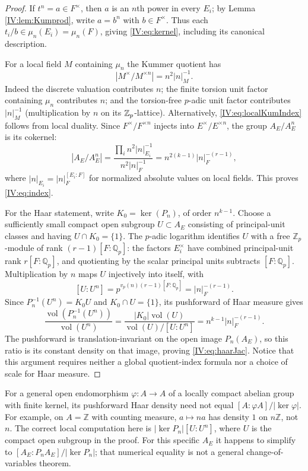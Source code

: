 \begin{proof}
If $t^n=a\in F^\times$, then $a$ is an $n$th power in every
$E_i$; by Lemma \ref{IV:lem:Kumprod}, write $a=b^n$ with $b\in F^\times$.
Thus each $t_i/b\in\mu_n(E_i)=\mu_n(F)$, giving
\eqref{IV:eq:kernel}, including its canonical description.

For a local field $M$ containing $\mu_n$ the Kummer quotient has
\begin{equation}\label{IV:eq:localKumIndex}
 |M^\times/M^{\times n}|=n^2|n|_M^{-1}.
\end{equation}
Indeed the discrete valuation contributes $n$; the finite
torsion unit factor containing $\mu_n$ contributes $n$; and
the torsion-free $p$-adic unit factor contributes
$|n|_M^{-1}$ (multiplication by $n$ on its $\mathbb Z_p$-lattice).  Alternatively, \eqref{IV:eq:localKumIndex}
follows from local duality.
Since $F^\times/F^{\times n}$ injects into
$E^\times/E^{\times n}$, the group $A_E/A_E^n$ is its cokernel:
\[
 |A_E/A_E^n|
 =\frac{\prod_i n^2|n|_{E_i}^{-1}}
             {n^2|n|_F^{-1}}
 =n^{2(k-1)}|n|_F^{-(r-1)},
\]
where $|n|_{E_i}=|n|_F^{[E_i:F]}$ for normalized absolute values
on local fields.  This proves \eqref{IV:eq:index}.

For the Haar statement, write $K_0=\ker(P_n)$, of order
$n^{k-1}$.  Choose a sufficiently small compact open subgroup
$U\subset A_E$ consisting of principal-unit classes and having
$U\cap K_0=\{1\}$.  The $p$-adic logarithm identifies $U$ with
a free $\mathbb Z_p$-module of rank
$(r-1)[F:\mathbb Q_p]$: the factors $E_i^\times$ have combined
principal-unit rank $r[F:\mathbb Q_p]$, and quotienting by the
scalar principal units subtracts $[F:\mathbb Q_p]$.
Multiplication by $n$ maps $U$ injectively into itself, with
\[
 [U:U^n]=p^{v_p(n)(r-1)[F:\mathbb Q_p]}
        =|n|_F^{-(r-1)}.
\]
Since $P_n^{-1}(U^n)=K_0U$ and $K_0\cap U=\{1\}$, its
pushforward of Haar measure gives
\[
 \frac{\operatorname{vol}(P_n^{-1}(U^n))}
      {\operatorname{vol}(U^n)}
   =\frac{|K_0|\operatorname{vol}(U)}
          {\operatorname{vol}(U)/[U:U^n]}
   =n^{k-1}|n|_F^{-(r-1)}.
\]
The pushforward is translation-invariant on the open image
$P_n(A_E)$, so this ratio is its constant density on that image,
proving \eqref{IV:eq:haarJac}.  Notice that this argument requires
neither a global quotient-index formula nor a choice of scale for
Haar measure.
\end{proof}

\begin{remark}\label{IV:rem:haar}
For a general open endomorphism $\varphi:A\to A$ of a locally
compact abelian group with finite kernel, its pushforward Haar density
need not equal $[A:\varphi A]/|\ker\varphi|$.  For example, on
$A=\mathbb Z$ with counting measure, $a\mapsto na$ has density
$1$ on $n\mathbb Z$, not $n$.  The correct local computation here is
$|\ker P_n|[U:U^n]$, where $U$ is the compact open subgroup in
the proof.  For this specific $A_E$ it happens to simplify to
$[A_E:P_nA_E]/|\ker P_n|$; that numerical equality is not a
general change-of-variables theorem.
\end{remark}

